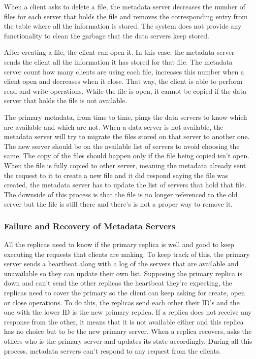 When a client asks to delete a file, the metadata server decreases the
number of files for each server that holds the file and removes the 
corresponding entry from the table where all the information is stored. 
The system does not provide any functionality to clean the garbage that 
the data servers keep stored.

After creating a file, the client can open it. In this case, the metadata 
server sends the client all the information it has stored for that file.
The metadata server count how many clients are using each file, increases
this number when a client open and decreases when it close.
That way, the client is able to perform read and write operations. While 
the file is open, it cannot be copied if the data server that holds the 
file is not available.

The primary metadata, from time to time, pings the data servers to know 
which are available and which are not. When a data server is not 
available, the metadata server will try to migrate the files stored on 
that server to another one. The new server should be on the available list of
servers to avoid choosing the same. The copy of the files should happen only
if the file being copied isn't open. When the file is fully copied to other 
server, meaning the metadata already sent the request to it to create a 
new file and it did respond saying the file was created, the metadata 
server has to update the list of servers that hold that file. The downside 
of this process is that the file is no longer referenced to the 
old server but the file is still there and there's is not a proper way 
to remove it.

\subsubsection{Failure and Recovery of Metadata Servers}

All the replicas need to know if the primary replica is well and good to 
keep executing the requests that clients are making. To keep track of this, 
the primary server sends a heartbeat along with a log of the servers that 
are available and unavailable so they can update their own list. Supposing 
the primary replica is down and can't send the other replicas the heartbeat 
they're expecting, the replicas need to cover the primary so the client can 
keep asking for create, open or close operations. To do this, the replicas 
send each other their ID's and the one with the lower ID is the new primary
replica. If a replica does not receive any response from the other, it 
means that it is not available either and this replica has no choice but to 
be the new primary server. When a replica recovers, asks the others who is 
the primary server and updates its state accordingly. During all this process, 
metadata servers can't respond to any request from the clients.
